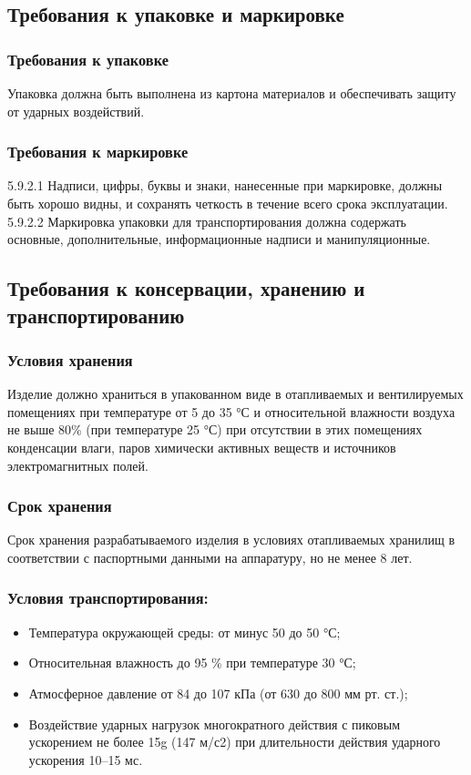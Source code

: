 		\subsection{Требования к упаковке и маркировке}
			\subsubsection{Требования к упаковке}
				Упаковка должна быть выполнена из картона материалов и обеспечивать защиту от ударных воздействий.
			\subsubsection{Требования к маркировке}
				5.9.2.1 Надписи, цифры, буквы и знаки, нанесенные при маркировке, должны быть хорошо видны, и сохранять четкость в течение всего срока эксплуатации.
				5.9.2.2 Маркировка упаковки для транспортирования должна содержать основные, дополнительные, информационные надписи и манипуляционные.
		\subsection{Требования к консервации, хранению и транспортированию}
			\subsubsection{Условия хранения}
				Изделие должно храниться в упакованном виде в отапливаемых и вентилируемых помещениях при температуре от 5 до 35 °С и относительной влажности воздуха не выше 80\% (при температуре 25 °С) при отсутствии в этих помещениях конденсации влаги, паров химически активных веществ и источников электромагнитных полей.
			\subsubsection{Срок хранения}
				Срок хранения разрабатываемого изделия в условиях отапливаемых хранилищ в соответствии с паспортными данными на аппаратуру, но не менее 8 лет.
			\subsubsection{Условия транспортирования:}
				\begin{itemize}
					\item Температура окружающей среды: от минус 50 до 50 °С;
					\item Относительная влажность до 95 \% при температуре 30 °С;
					\item Атмосферное давление от 84 до 107 кПа (от 630 до 800 мм рт. ст.);
					\item Воздействие ударных нагрузок многократного действия с пиковым ускорением не более 15g (147 м/с2) при длительности действия ударного ускорения 10–15 мс.
				\end{itemize}
